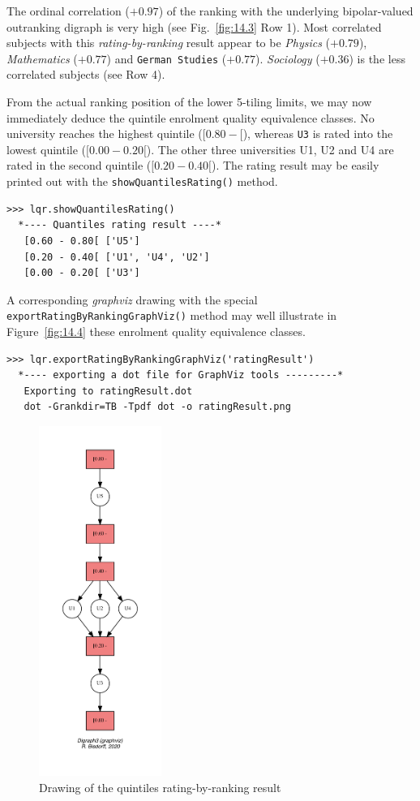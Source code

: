 The ordinal correlation ($+0.97$) of the \Copeland ranking with the underlying bipolar-valued outranking digraph is very high (see Fig.~\vref{fig:14.3} Row 1). Most correlated subjects with this \emph{rating-by-ranking} result appear to be \emph{Physics} ($+0.79$), \emph{Mathematics} ($+0.77$) and \texttt{German Studies} ($+0.77$). \emph{Sociology} ($+0.36$) is the less correlated subjects (see Row 4).

From the actual ranking position of the lower 5-tiling limits, we may now immediately deduce the quintile enrolment quality equivalence classes. No university reaches the highest quintile ($[0.80 - [$), whereas \texttt{U3} is rated into the lowest quintile ($[0.00- 0.20[$). The other three universities U1, U2 and U4 are rated in the second quintile ($[0.20- 0.40[$). The rating result may be easily printed out with the \texttt{showQuantilesRating()} method.
\begin{lstlisting}[caption={Showing the quintiling of the enrolment quality of the 5 Universities},label=list:14.3]
>>> lqr.showQuantilesRating()
  *---- Quantiles rating result ----*
   [0.60 - 0.80[ ['U5']
   [0.20 - 0.40[ ['U1', 'U4', 'U2']
   [0.00 - 0.20[ ['U3']
\end{lstlisting}

A corresponding \emph{graphviz} drawing with the special \texttt{exportRatingByRan\-kingGraphViz()} method may well illustrate in Figure~\vref{fig:14.4} these enrolment quality equivalence classes.
\begin{lstlisting}
>>> lqr.exportRatingByRankingGraphViz('ratingResult')
  *---- exporting a dot file for GraphViz tools ---------*
   Exporting to ratingResult.dot
   dot -Grankdir=TB -Tpdf dot -o ratingResult.png
\end{lstlisting}
\begin{figure}[ht]
\sidecaption[t]
\includegraphics[width=4cm]{Figures/14-4-ratingResult.pdf}
\caption{Drawing of the quintiles rating-by-ranking result}
\label{fig:14.4}       %
\end{figure}

